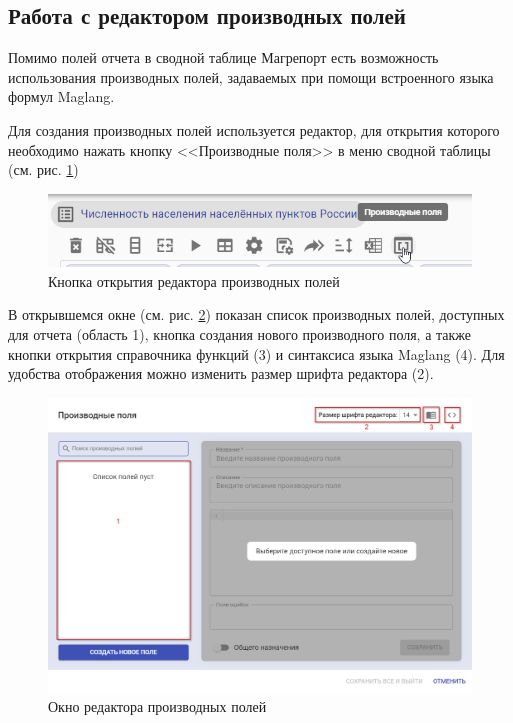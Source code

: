\documentclass[../user-manual.tex]{subfiles}
\begin{document}
	\subsection{Работа с редактором производных полей}
	
	Помимо полей отчета в сводной таблице Магрепорт есть возможность использования производных полей, задаваемых при помощи встроенного языка формул Maglang.
	
	Для создания производных полей используется редактор, для открытия которого необходимо нажать кнопку <<Производные поля>> в меню сводной таблицы (см. рис. \ref{fig:derived_fields})
	
	\begin{figure}[h]
	\centering
	\includegraphics[width=\graphicswidth]{img/30-derived_fields.png}
	\caption{Кнопка открытия редактора производных полей}
	\label{fig:derived_fields}
	\end{figure}

	В открывшемся окне (см. рис. \ref{fig:derived_fields_window}) показан список производных полей, доступных для отчета (область 1), кнопка создания нового производного поля, а также кнопки открытия справочника функций (3) и синтаксиса языка Maglang (4). Для удобства отображения можно изменить размер шрифта редактора (2).
	
	\begin{figure}[h]
	\centering
	\includegraphics[width=\graphicswidth]{img/31-derived_fields_window.png}
	\caption{Окно редактора производных полей}
	\label{fig:derived_fields_window}
	\end{figure}
\end{document}
